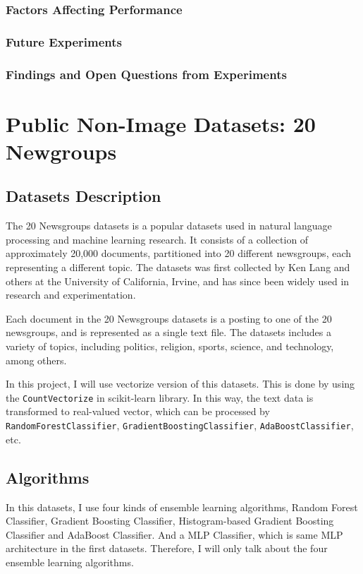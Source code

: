 \documentclass[twocolumn]{extarticle}
\begin{document}
\subsubsection{Factors Affecting Performance}
\subsubsection{Future Experiments}
\subsubsection{Findings and Open Questions from Experiments}
\section{Public Non-Image Datasets: 20 Newgroups}
\subsection{Datasets Description}

The 20 Newsgroups datasets is a popular datasets used in natural language processing and machine learning research. It consists of a collection of approximately 20,000 documents, partitioned into 20 different newsgroups, each representing a different topic. The datasets was first collected by Ken Lang and others at the University of California, Irvine, and has since been widely used in research and experimentation.

Each document in the 20 Newsgroups datasets is a posting to one of the 20 newsgroups, and is represented as a single text file. The datasets includes a variety of topics, including politics, religion, sports, science, and technology, among others.

In this project, I will use vectorize version of this datasets. This is done by using the \texttt{CountVectorize} in scikit-learn library. In this way, the text data is transformed to real-valued vector, which can be processed by \texttt{RandomForestClassifier}, \texttt{GradientBoostingClassifier}, \texttt{AdaBoostClassifier}, etc.

\subsection{Algorithms}

In this datasets, I use four kinds of ensemble learning algorithms, Random Forest Classifier, Gradient Boosting Classifier, Histogram-based Gradient Boosting Classifier and AdaBoost Classifier. And a MLP Classifier, which is same MLP architecture in the first datasets. Therefore, I will only talk about the four ensemble learning algorithms.
\end{document}
